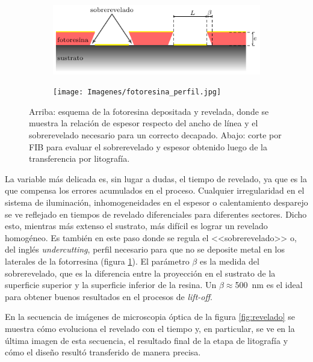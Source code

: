  				\begin{figure}[b!]
 				\centering
 				\begin{subfigure}[t]{0.935\textwidth}
 				\hspace{0.29cm}\includegraphics[width=\textwidth]{Esquemas/altura-ancho.pdf}
 				\end{subfigure}
 				\begin{subfigure}[t]{0.86\textwidth}
 				\texttt{[image: Imagenes/fotoresina\_perfil.jpg]}
 				\end{subfigure}
 				\caption[Perfil de fotorresina para el decapado o\textit{ lift-off}]{Arriba: esquema de la fotoresina depositada y revelada, donde se muestra la relación de espesor respecto del ancho de línea y el sobrerevelado necesario para un correcto decapado. Abajo: corte por FIB para evaluar el sobrerevelado y espesor obtenido luego de la transferencia por litografía.}
 				\label{fig:undercut}
 				\end{figure}

 	   		 La variable más delicada es, sin lugar a dudas, el tiempo de revelado, ya que es la que compensa los errores acumulados en el proceso. Cualquier irregularidad en el sistema de iluminación, inhomogeneidades en el espesor o calentamiento desparejo se ve reflejado en tiempos de revelado diferenciales para diferentes sectores. Dicho esto, mientras más extenso el sustrato, más difícil es lograr un revelado homogéneo. Es también en este paso donde se regula el <<sobrerevelado>> o, del inglés \textit{undercutting}, perfil necesario para que no se deposite metal en los laterales de la fotorresina (figura \ref{fig:undercut}). El parámetro $\beta$ es la medida del sobrerevelado, que es la diferencia entre la proyección en el sustrato de la superficie superior y la superficie inferior de la resina. Un $\beta\!\!\approx$\SI{500}{\nm} es el ideal para obtener buenos resultados en el procesos de \textit{lift-off}. 
 
 	         En la secuencia de imágenes de microscopia óptica de la figura \ref{fig:revelado} se muestra cómo evoluciona el revelado con el tiempo y, en particular, se ve en la última imagen de esta secuencia, el resultado final de la etapa de litografía y cómo el diseño resultó transferido de manera precisa.

